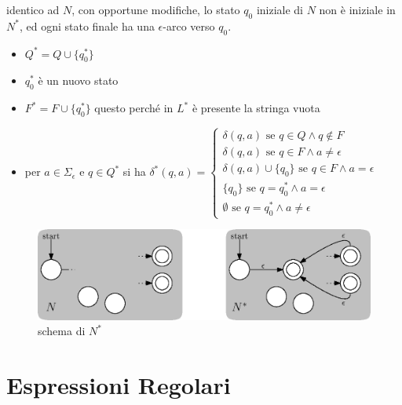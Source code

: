 \documentclass[10pt, letterpaper]{report}
\begin{document}
 identico ad $N$, con opportune 
modifiche, lo stato $q_0$ iniziale di $N$ non è iniziale in $N^*$, 
ed ogni stato finale ha una $\epsilon$-arco verso $q_0$.\begin{itemize}
    \item $Q^*=Q\cup\{q_0^*\}$
    \item $q_0^*$ è un nuovo stato 
    \item $F^*=F\cup\{q_0^*\}$ questo perché in $L^*$ è presente la stringa vuota
    \item per $a\in\Sigma_\epsilon$ e $q\in Q^*$ si ha $\delta^*(q,a)=\begin{cases}
        \delta(q,a) \text{ se }q\in Q\land q\notin F\\ 
        \delta(q,a) \text{ se }q\in F\land a\ne \epsilon\\
        \delta(q,a)\cup\{q_0\} \text{ se }q\in F\land a= \epsilon\\
        \{q_0\}\text{ se }q=q_0^*\land a =\epsilon\\ 
        \emptyset \text{ se }q=q_0^*\land a\ne \epsilon
    \end{cases}$
\end{itemize}
\begin{center}
    \begin{figure}[h!]
        \centering 
        \includegraphics[width=1\textwidth ]{images/starChiusa.eps}
        \caption{schema di $N^*$}
        \label{fig:starChiusa}
    \end{figure}
\end{center}
\flowerLine 
\section{Espressioni Regolari}
\end{document}
